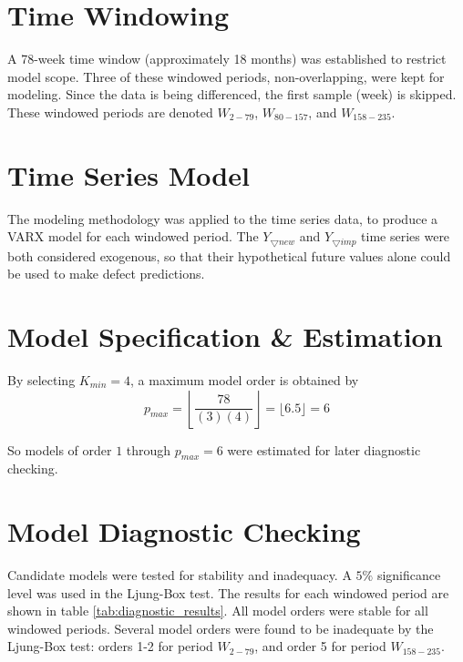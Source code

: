 \documentclass[letterpaper]{report}
\begin{document}
\section*{Time Windowing}
A 78-week time window (approximately 18 months) was established to restrict model scope. Three of these windowed periods, non-overlapping, were kept for modeling. Since the data is being differenced, the first sample (week) is skipped. These windowed periods are denoted $W_{2-79}$, $W_{80-157}$, and $W_{158-235}$.

\section*{Time Series Model}

The modeling methodology was applied to the time series data, to produce a VARX model for each windowed period. The $Y_{\bigtriangledown new}$ and $Y_{\bigtriangledown imp}$ time series were both considered exogenous, so that their hypothetical future values alone could be used to make defect predictions.

\section*{Model Specification \& Estimation}

By selecting $K_{min} = 4$, a maximum model order is obtained by
\begin{equation}
p_{max} = \left \lfloor \frac{78}{(3)(4)} \right \rfloor = \lfloor 6.5 \rfloor = 6
\end{equation}

So models of order $1$ through $p_{max}=6$ were estimated for later diagnostic checking.

\section*{Model Diagnostic Checking}

Candidate models were tested for stability and inadequacy. A $5\%$ significance level was used in the Ljung-Box test. The results for each windowed period are shown in table \ref{tab:diagnostic_results}. All model orders were stable for all windowed periods. Several model orders were found to be inadequate by the Ljung-Box test: orders 1-2 for period $W_{2-79}$, and order 5 for period $W_{158-235}$.
\end{document}

